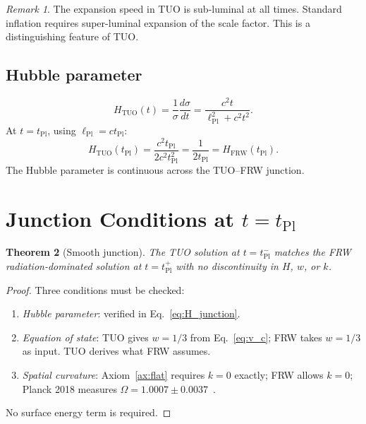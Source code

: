 \documentclass[12pt,a4paper]{article}
\newtheorem{theorem}{Theorem}[section]
\theoremstyle{definition}
\theoremstyle{remark}
\newtheorem{remark}[theorem]{Remark}
\newcommand{\tPl}{t_{\mathrm{Pl}}}
\newcommand{\lPl}{\ell_{\mathrm{Pl}}}
\begin{document}
\begin{remark}
The expansion speed in TUO is sub-luminal at all times.
Standard inflation requires super-luminal expansion of the scale factor.
This is a distinguishing feature of TUO.
\end{remark}

\subsection{Hubble parameter}

\begin{equation}\label{eq:H_TUO}
  H_{\mathrm{TUO}}(t)
  = \frac{1}{\sigma}\frac{d\sigma}{dt}
  = \frac{c^2 t}{\lPl^2 + c^2 t^2}.
\end{equation}
At $t = \tPl$, using $\lPl = c\tPl$:
\begin{equation}\label{eq:H_junction}
  H_{\mathrm{TUO}}(\tPl)
  = \frac{c^2\tPl}{2c^2\tPl^2}
  = \frac{1}{2\tPl}
  = H_{\mathrm{FRW}}(\tPl).
\end{equation}
The Hubble parameter is continuous across the TUO--FRW junction.

\section{Junction Conditions at $t = \tPl$}
\label{sec:junction}

\begin{theorem}[Smooth junction]\label{thm:junction}
The TUO solution at $t = \tPl^-$ matches the FRW radiation-dominated
solution at $t = \tPl^+$ with no discontinuity in $H$, $w$, or $k$.
\end{theorem}
\begin{proof}
Three conditions must be checked:
\begin{enumerate}[label=(\roman*)]
  \item \textit{Hubble parameter}: verified in Eq.~\eqref{eq:H_junction}. \checkmark
  \item \textit{Equation of state}: TUO gives $w = 1/3$ from
        Eq.~\eqref{eq:v_c}; FRW takes $w = 1/3$ as input.
        TUO derives what FRW assumes. \checkmark
  \item \textit{Spatial curvature}: Axiom~\ref{ax:flat} requires $k = 0$
        exactly; FRW allows $k = 0$; Planck 2018 measures
        $\Omega = 1.0007 \pm 0.0037$~\cite{Planck2018}. \checkmark
\end{enumerate}
No surface energy term is required.
\end{proof}
\end{document}
